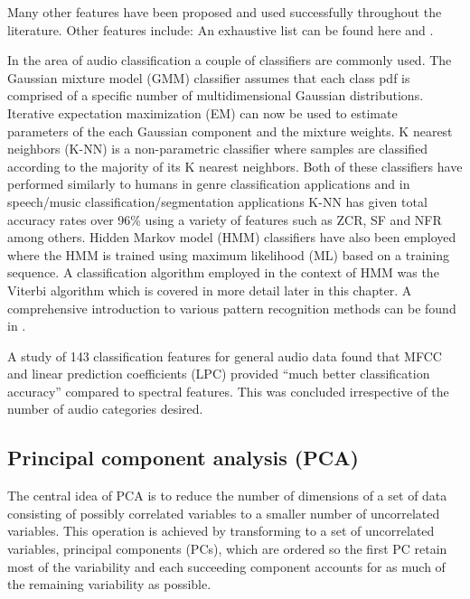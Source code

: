 Many other features have been proposed and used successfully throughout the literature. Other features include: An exhaustive list can be found here \cite{Scheirer1997} and \cite{Gouyon2000}.



In the area of audio classification a couple of classifiers are commonly used. The Gaussian mixture model (GMM) classifier assumes that each class pdf is comprised of a specific number of multidimensional Gaussian distributions. Iterative expectation maximization (EM) can now be used to estimate parameters of the each Gaussian component and the mixture weights\cite{Tzanetakis2002}. K nearest neighbors (K-NN) is a non-parametric classifier where samples are classified according to the majority of its K nearest neighbors\cite{Lu2001}. Both of these classifiers have performed similarly to humans in genre classification applications\cite{Tzanetakis2002} and in speech/music classification/segmentation applications K-NN has given total accuracy rates over 96\% using a variety of features such as ZCR, SF and NFR among others\cite{Lu2002}. Hidden Markov model (HMM) classifiers have also been employed where the HMM is trained using maximum likelihood (ML) based on a training sequence\cite{Kimber1997}\cite{Xiong2003}\cite{Burke2013}. A classification algorithm employed in the context of HMM was the Viterbi algorithm which is covered in more detail later in this chapter\cite{Kimber1997}\cite{Burke2013}.
A comprehensive introduction to various pattern recognition methods can be found in \cite{Duda2001}.

A study of 143 classification features for general audio data found that MFCC and linear prediction coefficients (LPC) provided ``much better classification accuracy'' compared to spectral features\cite{Li2001}. This was concluded irrespective of the number of audio categories desired.

\subsection{Principal component analysis (PCA)}
The central idea of PCA is to reduce the number of dimensions of a set of data consisting of possibly correlated variables to a smaller number of uncorrelated variables. This operation is achieved by transforming to a set of uncorrelated variables, principal components (PCs), which are ordered so the first PC retain most of the variability and each succeeding component accounts for as much of the remaining variability as possible.

